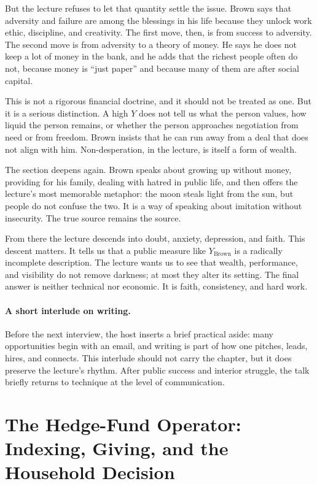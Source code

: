 But the lecture refuses to let that quantity settle the issue. Brown says that adversity and failure are among the blessings in his life because they unlock work ethic, discipline, and creativity. The first move, then, is from success to adversity. The second move is from adversity to a theory of money. He says he does not keep a lot of money in the bank, and he adds that the richest people often do not, because money is ``just paper'' and because many of them are after social capital.

This is not a rigorous financial doctrine, and it should not be treated as one. But it is a serious distinction. A high \(Y\) does not tell us what the person values, how liquid the person remains, or whether the person approaches negotiation from need or from freedom. Brown insists that he can run away from a deal that does not align with him. Non-desperation, in the lecture, is itself a form of wealth.

The section deepens again. Brown speaks about growing up without money, providing for his family, dealing with hatred in public life, and then offers the lecture's most memorable metaphor: the moon steals light from the sun, but people do not confuse the two. It is a way of speaking about imitation without insecurity. The true source remains the source.

From there the lecture descends into doubt, anxiety, depression, and faith. This descent matters. It tells us that a public measure like \(Y_{\text{Brown}}\) is a radically incomplete description. The lecture wants us to see that wealth, performance, and visibility do not remove darkness; at most they alter its setting. The final answer is neither technical nor economic. It is faith, consistency, and hard work.

\paragraph{A short interlude on writing.} Before the next interview, the host inserts a brief practical aside: many opportunities begin with an email, and writing is part of how one pitches, leads, hires, and connects. This interlude should not carry the chapter, but it does preserve the lecture's rhythm. After public success and interior struggle, the talk briefly returns to technique at the level of communication.

\section{The Hedge-Fund Operator: Indexing, Giving, and the Household Decision}

